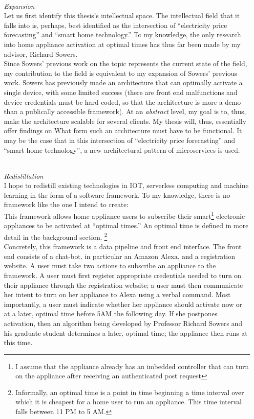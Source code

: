\documentclass[a4paper]{article}
\begin{document}
\breathe \\
\textit{Expansion} \\

Let us first identify this thesis's intellectual space. The intellectual field that it falls into is, perhaps, best identified as the intersection of ``electricity price forecasting'' and ``smart home technology.'' To my knowledge, the only research into home appliance activation at optimal times has thus far been made by my advisor, Richard Sowers.  \\

Since Sowers' previous work on the topic represents the current state of the field, my contribution to the field is equivalent to my expansion of Sowers' previous work. Sowers has previously made an architecture that can optimally activate a single device, with some limited success (there are front end malfunctions and device credentials must be hard coded, so that the architecture is more a demo than a publically accessible framework). At an \textit{abstract} level, my goal is to, thus, make the architecture scalable for several clients. My thesis will, thus, essentially offer findings on What form such an architecture must have to be functional. It may be the case that in this intersection of ``electricity price forecasting'' and ``smart home technology'', a new architectural pattern of microservices is used.

\breathe \\
\textit{Redistillation} \\

I hope to redistill existing technologies in IOT, serverless computing and machine learning in the form of a software framework. To my knowledge, there is no framework like the one I intend to create: \\

This framework allows home appliance users to subscribe their smart\footnote{I assume that the appliance already has an imbedded controller that can turn on the appliance after receiving an authenticated post request} electronic
appliances  to be activated at ``optimal times.'' An optimal time is defined in more detail in the background section. \footnote{Informally, an optimal time is a point in time beginning a time interval over which it is cheapest for a home user to run an appliance. This time interval falls between 11 PM to 5 AM.} \\

Concretely, this framework is a data pipeline and front end interface. The front end consists of a chat-bot, in particular an Amazon Alexa, and a registration website. A user must take two actions to subscribe an appliance to the framework. A user must first register appropriate credentials needed to turn on their appliance through the registration website; a user must then communicate her intent to turn on her appliance to Alexa using a verbal command. Most importantly, a user must indicate whether her appliance should activate now or at a later, optimal time before 5AM the following day. If she postpones activation, then an algorithm being developed by Professor Richard Sowers and his graduate student determines a later, optimal time; the appliance then runs at this time.
\end{document}
